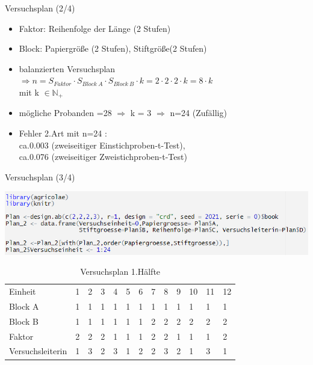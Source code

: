 \documentclass[ ngerman, fontsize= 10pt, headings=big, titlepage=true, xcolor=dvipsnames]{beamer}
\begin{document}
\begin{frame}{Versuchsplan (2/4)}
	
	
	\begin{itemize}
		\item Faktor: Reihenfolge der Länge (2 Stufen)
		\item Block: Papiergröße (2 Stufen), Stiftgröße(2 Stufen)	
		\item balanzierten Versuchsplan\\
		 $\Rightarrow n = S_{Faktor} \cdot S_{Block\ A} \cdot  S_{Block\ B} \cdot k =2 \cdot 2\cdot 2\cdot k = 8\cdot k$ \\
		 mit k $\in \mathbb{N}_+$
		
		\item mögliche Probanden =28 $\Rightarrow$ k = 3 $\Rightarrow$ n=24 (Zufällig)
		\item Fehler 2.Art mit n=24 :\\
		 ca.0.003 (zweiseitiger Einstichproben-t-Test),\\ 
		 ca.0.076 (zweiseitiger Zweistichproben-t-Test)
		
		
	\end{itemize}
	
\end{frame}
\begin{frame}[fragile]{Versuchsplan (3/4)}
	
\includegraphics[scale=0.7]{Code_Versuchsplan.png}

{\small
\begin{table}[hb]
	\caption{Versuchsplan 1.Hälfte}
	\centering
	\begin{tabular}[b]{l||l|l|l|l|l|l|l|l|l|l|l|l}
		\hline
		Einheit & 1 & 2 & 3 & 4 & 5 & 6 & 7 & 8 & 9 & 10 & 11 & 12\\
		\hhline{=============}
		Block A & 1 & 1 & 1 & 1 & 1 & 1 & 1 & 1 & 1 & 1 & 1 & 1\\
		\hline
		Block B & 1 & 1 & 1 & 1 & 1 & 1 & 2 & 2 & 2 & 2 & 2 & 2\\
		\hline
		Faktor & 2 & 2 & 2 & 1 & 1 & 1 & 2 & 2 & 1 & 1 & 1 & 2\\
		\hhline{=============}
		{\tiny Versuchsleiterin} & 1 & 3 & 2 & 3 & 1 & 2 & 2 & 3 & 2 & 1 & 3 & 1\\
		\hline
	\end{tabular}
\end{table}}

\end{frame}
\end{document}
